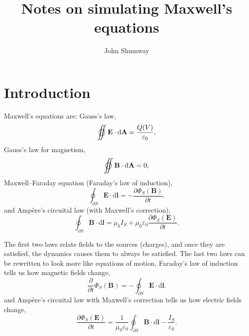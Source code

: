 \documentclass[11pt]{amsart}
\title{Notes on simulating Maxwell's equations}
\author{John Shumway}
\begin{document}
\maketitle
\section{Introduction}

Maxwell's equations are: Gauss's law,
\begin{equation}
\varoiint
\mathbf{E}\cdot\mathrm{d}\mathbf{A} 
= \frac{Q(V)}{\varepsilon_0},
 \end{equation}
 Gauss's law for magnetism,
 \begin{equation}
\varoiint
\mathbf{B}\cdot\mathrm{d}\mathbf{A} = 0,
\end{equation}
Maxwell--Faraday equation (Faraday's law of induction),
\begin{equation}
\oint_{\partial S} 
\mathbf{E} \cdot \mathrm{d}\mathbf{l}  = - \frac {\partial \Phi_S{(\mathbf B)}}{\partial t}.
\end{equation}
and Amp\`ere's circuital law (with Maxwell's correction),
\begin{equation}
\oint_{\partial S} \mathbf{B} \cdot \mathrm{d}\mathbf{l} 
= \mu_0 I_S + \mu_0 \varepsilon_0 \frac {\partial \Phi_S{(\mathbf E)}}{\partial t}.
\end{equation}

The first two laws relate fields to the sources (charges), and once they are
satisfied, the dynamics causes them to always be satisfied.
The last two laws can be rewritten to look more like equations of motion,
Faraday's law of induction tells us how magnetic fields change,
\begin{equation}
\frac {\partial}{\partial t} \Phi_S(\mathbf B) =
-\oint_{\partial S} 
\mathbf{E} \cdot \mathrm{d}\mathbf{l}.
\end{equation}
and Amp\`ere's circuital law with Maxwell's correction tells us how electric fields
change,
\begin{equation}
\frac {\partial \Phi_S{(\mathbf E)}}{\partial t} 
=
\frac{1}{ \mu_0 \varepsilon_0} \oint_{\partial S} \mathbf{B} \cdot \mathrm{d}\mathbf{l} 
- \frac{I_S}{\varepsilon_0}.
\end{equation}
\end{document}
